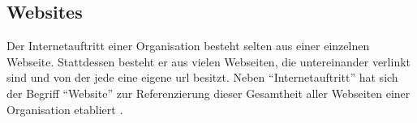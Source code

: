         \subsection{Websites}
            \label{section:problemAnalysisWebpagesInTheWWWWebsites}
            Der Internetauftritt einer Organisation besteht selten aus einer
            einzelnen Webseite.
            Stattdessen besteht er aus vielen Webseiten,
            die untereinander verlinkt sind und von der jede eine eigene
            \gls{url} besitzt.
            Neben "`Internetauftritt"' hat sich der Begriff "`Website"' zur
            Referenzierung dieser Gesamtheit aller Webseiten einer Organisation
            etabliert \cite{duden:Internetauftritt, oxford:Website}.